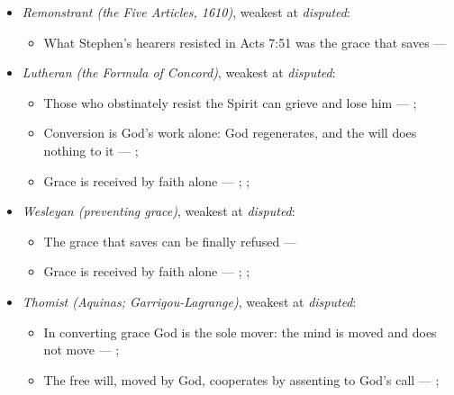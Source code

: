 \documentclass[11pt]{article}
\begin{document}
\begin{itemize}
\begin{itemize}
\end{itemize}
\item \emph{Remonstrant (the Five Articles, 1610)}, weakest at \emph{disputed}:
\begin{itemize}
\item What Stephen’s hearers resisted in Acts 7:51 was the grace that saves --- \cite[Five Arminian Articles (1610), art. 4]{schaff-creeds-christendom-3-1977}
\end{itemize}
\item \emph{Lutheran (the Formula of Concord)}, weakest at \emph{disputed}:
\begin{itemize}
\item Those who obstinately resist the Spirit can grieve and lose him --- \cite[Solid Declaration II.83]{concordia-triglotta-1921}; \cite[Solid Declaration XI.42]{concordia-triglotta-1921}
\item Conversion is God’s work alone: God regenerates, and the will does nothing to it --- \cite[Solid Declaration II.89]{concordia-triglotta-1921}; \cite[Solid Declaration II.90]{concordia-triglotta-1921}
\item Grace is received by faith alone --- \cite[Augsburg Confession IV.1–3]{concordia-triglotta-1921}; \cite[Sermon 1, III.1]{wesley-sermons-1872}; \cite[Trent, Session VI (1547), canon 9]{tanner-decrees-1990}
\end{itemize}
\item \emph{Wesleyan (preventing grace)}, weakest at \emph{disputed}:
\begin{itemize}
\item The grace that saves can be finally refused --- \cite[397]{wesley-works-9-1827}
\item Grace is received by faith alone --- \cite[Augsburg Confession IV.1–3]{concordia-triglotta-1921}; \cite[Sermon 1, III.1]{wesley-sermons-1872}; \cite[Trent, Session VI (1547), canon 9]{tanner-decrees-1990}
\end{itemize}
\item \emph{Thomist (Aquinas; Garrigou-Lagrange)}, weakest at \emph{disputed}:
\begin{itemize}
\item In converting grace God is the sole mover: the mind is moved and does not move --- \cite[I-II q.111 a.2]{aquinas-summa-1920}; \cite[ch. IV]{garrigou-lagrange-grace-1952}
\item The free will, moved by God, cooperates by assenting to God’s call --- \cite[Trent, Session VI (1547), canon 4]{tanner-decrees-1990}; \cite[45]{waterworth-trent-1848}

\end{itemize}
\end{itemize}
\end{document}
